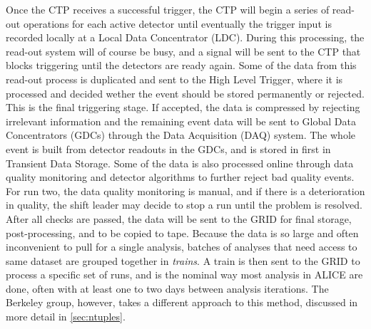 Once the CTP receives a successful trigger, the CTP will begin a series of read-out operations for each active detector until eventually the trigger input is recorded locally at a Local Data Concentrator (LDC). During this processing, the read-out system will of course be busy, and a signal will be sent to the CTP that blocks triggering until the detectors are ready again. Some of the data from this read-out process is duplicated and sent to the High Level Trigger, where it is processed and decided wether the event should be stored permanently or rejected. This is the final triggering stage. If accepted, the data is compressed by rejecting irrelevant information and the remaining event data will be sent to Global Data Concentrators (GDCs) through the Data Acquisition (DAQ) system. The whole event is built from detector readouts in the GDCs, and is stored in first in Transient Data Storage. Some of the data is also processed online through data quality monitoring and detector algorithms to further reject bad quality events. For run two, the data quality monitoring is manual, and if there is a deterioration in quality, the shift leader may decide to stop a run until the problem is resolved. After all checks are passed, the data will be sent to the GRID for final storage, post-processing, and to be copied to tape. Because the data is so large and often inconvenient to pull for a single analysis, batches of analyses that need access to same dataset are grouped together in \textit{trains}. A train is then sent to the GRID to process a specific set of runs, and is the nominal way most analysis in ALICE are done, often with at least one to two days between analysis iterations. The Berkeley group, however, takes a different approach to this method, discussed in more detail in \ref{sec:ntuples}.


